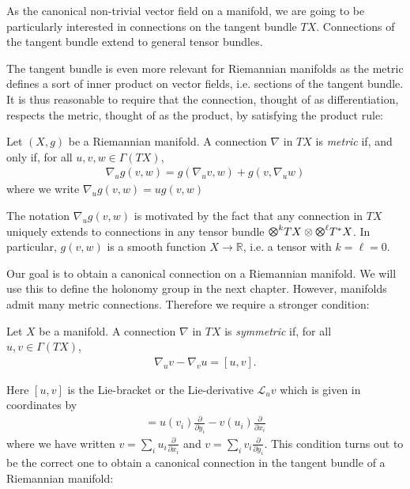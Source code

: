 \documentclass{article}
\begin{document}
As the canonical non-trivial vector field on a manifold,
we are going to be particularly interested in connections on the
tangent bundle $TX$. Connections of the tangent bundle extend to
general tensor bundles.

The tangent bundle is even more relevant for
Riemannian manifolds as the metric defines a sort of inner product
on vector fields, i.e. sections of the tangent bundle.
It is thus reasonable to require that the connection, thought of
as differentiation, respects the metric, thought of as the product,
by satisfying the product rule:

\begin{definition}
  Let $(X,g)$ be a Riemannian manifold. A connection $\nabla$ in $TX$ is
  \emph{metric} if, and only if, for all $u,v,w\in\Gamma(TX)$,
  \begin{align*}
    \nabla_u g(v,w) = g(\nabla_u v, w) + g(v,\nabla_u w)
  \end{align*}
  where we write $\nabla_u g(v,w) = u g(v,w)$
\end{definition}

The notation $\nabla_u g(v,w)$ is motivated by the fact that any
connection in $TX$ uniquely extends to connections in any tensor bundle
$\tensor{}{k}{TX}\otimes\tensor{}{\ell}{T^*X}$. In particular, $g(v,w)$
is a smooth function $X\to\mathbb{R}$, i.e. a tensor with $k=\ell=0$.

Our goal is to obtain a canonical connection on a Riemannian manifold.
We will use this to define the holonomy group in the next chapter.
However, manifolds admit many metric connections. Therefore we require
a stronger condition:

\begin{definition}
  Let $X$ be a manifold. A connection $\nabla$ in $TX$ is
  \emph{symmetric} if, for all $u,v\in\Gamma(TX)$,
  \begin{align*}
    \nabla_u v - \nabla_v u = [u,v].
  \end{align*}
\end{definition}

Here $[u,v]$ is the Lie-bracket or the Lie-derivative $\mathcal L_u v$
which is given in coordinates by
\begin{align*}
  [u,v] = u(v_i)\frac{\partial }{\partial y_i} - v(u_i)\frac{\partial}{\partial x_i}
\end{align*}
where we have written $v=\sum_i u_i\frac{\partial}{\partial x_i}$
and $v=\sum_i v_i\frac{\partial}{\partial y_i}$.
This condition turns out to be the correct one to obtain a canonical connection in the tangent bundle of a Riemannian manifold:
\end{document}
